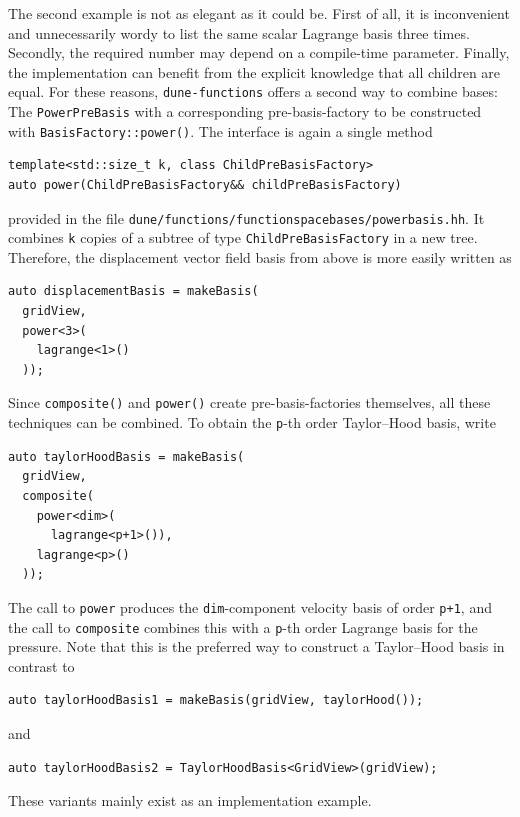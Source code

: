 \documentclass[a4paper,10pt,headings=normal,bibliography=totoc]{scrartcl}
\newcommand{\cpp}[1]{\lstinline[basicstyle=\ttfamily]!#1!}
\newcommand{\dunemodule}[1]{\texttt{#1}}
\newcommand{\file}[1]{\texttt{#1}}
\begin{document}
The second example is not as elegant as it could be.  First of all, it is inconvenient and unnecessarily
wordy to list the same scalar Lagrange basis three times.  Secondly, the required number may depend on
a compile-time parameter.
Finally, the implementation can benefit from the explicit knowledge that
all children are equal.
For these reasons, \dunemodule{dune-functions}
offers a second way to combine bases: The \cpp{PowerPreBasis} with a
corresponding pre-basis-factory to be constructed with \cpp{BasisFactory::power()}. 
The interface is again a single method
\begin{lstlisting}[style=Interface]
template<std::size_t k, class ChildPreBasisFactory>
auto power(ChildPreBasisFactory&& childPreBasisFactory)
\end{lstlisting}
provided in the file \file{dune/functions/functionspacebases/powerbasis.hh}.
It combines \cpp{k} copies of a subtree of type \cpp{ChildPreBasisFactory} in a new tree.  Therefore, the
displacement vector field basis from above is more easily written as
\begin{lstlisting}[style=Example]
auto displacementBasis = makeBasis(
  gridView,
  power<3>(
    lagrange<1>()
  ));
\end{lstlisting}
Since \cpp{composite()} and \cpp{power()} create pre-basis-factories themselves,
all these techniques can be combined. To obtain the \cpp{p}-th order Taylor--Hood basis,
write
\begin{lstlisting}[style=Example]
auto taylorHoodBasis = makeBasis(
  gridView,
  composite(
    power<dim>(
      lagrange<p+1>()),
    lagrange<p>()
  ));
\end{lstlisting}
The call to \cpp{power} produces the \cpp{dim}-component velocity basis of order \cpp{p+1},
and the call to \cpp{composite} combines this with a \cpp{p}-th order Lagrange basis for the pressure.
Note that this is the preferred way to construct a Taylor--Hood basis in contrast to
\begin{lstlisting}[style=Example]
auto taylorHoodBasis1 = makeBasis(gridView, taylorHood());
\end{lstlisting}
and
\begin{lstlisting}[style=Example]
auto taylorHoodBasis2 = TaylorHoodBasis<GridView>(gridView);
\end{lstlisting}
These variants mainly exist as an implementation example.
\end{document}
